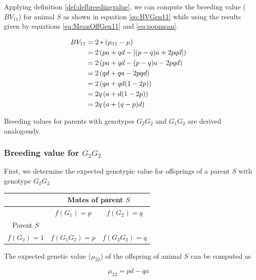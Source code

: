 \documentclass[
]{book}
\theoremstyle{definition}
\theoremstyle{definition}
\theoremstyle{definition}
\theoremstyle{remark}
\begin{document}
Applying definition \ref{def:defbreedingvalue}, we can compute the breeding value (\(BV_{11}\)) for animal \(S\) as shown in equation \eqref{eq:BVGen11} while using the results given by equations \eqref{eq:MeanOffGen11} and \eqref{eq:popmean}.

\begin{align}
BV_{11} &=  2*(\mu_{11} - \mu)  \notag \\
        &=  2\left(pa + qd - \left[(p - q)a + 2pqd \right] \right) \notag\\
        &=  2\left(pa + qd - (p - q)a - 2pqd \right) \notag\\
        &=  2\left(qd + qa - 2pqd\right) \notag \\
        &=  2\left(qa + qd(1 - 2p)\right) \notag \\
        &=  2q\left(a + d(1 - 2p)\right) \notag \\
        &=  2q\left(a + (q-p)d\right)
\label{eq:BVGen11}
\end{align}

Breeding values for parents with genotypes \(G_2G_2\) and \(G_1G_2\) are derived analogously.

\hypertarget{breeding-value-for-g_2g_2}{%
\subsubsection{\texorpdfstring{Breeding value for \(G_2G_2\)}{Breeding value for G\_2G\_2}}\label{breeding-value-for-g_2g_2}}

First, we determine the expected genotypic value for offsprings of a parent \(S\) with genotype \(G_2G_2\)

\vspace{5ex}

\begin{tabular}{|c|c|c|}
\hline
& \multicolumn{2}{|c|}{Mates of parent $S$} \\
\hline
& $f(G_1) = p$       &  $f(G_2) = q$   \\
\hline
Parent $S$       &                    &                 \\
\hline
$f(G_2) = 1$ &  $f(G_1G_2) = p$   &  $f(G_2G_2) = q$\\
\hline
\end{tabular}

\vspace{5ex}

The expected genetic value (\(\mu_{22}\)) of the offspring of animal \(S\) can be computed as

\begin{equation}
\mu_{22} = pd - qa
\label{eq:MeanOffGen22}
\end{equation}
\end{document}
